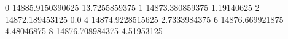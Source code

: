 0 14885.9150390625 13.7255859375
1 14873.380859375 1.19140625
2 14872.189453125 0.0
4 14874.9228515625 2.7333984375
6 14876.669921875 4.48046875
8 14876.708984375 4.51953125
